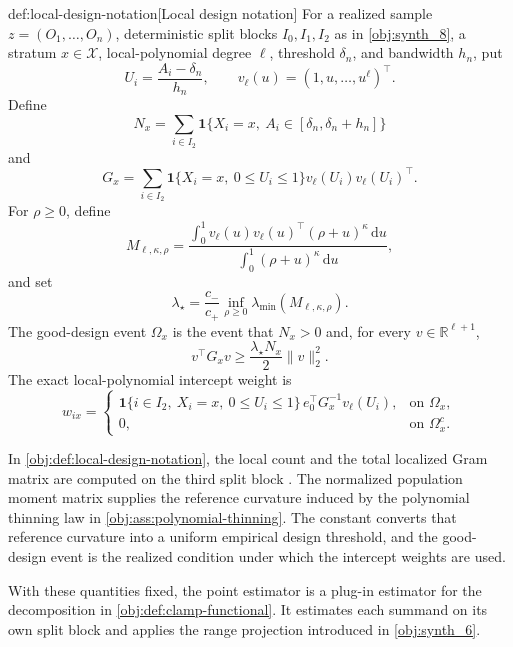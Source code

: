 \documentclass[11pt]{article}
\begin{document}
\begin{definitionv}{def:local-design-notation}[Local design notation]
For a realized sample \(z=(O_1,\ldots,O_n)\), deterministic split blocks \(I_0,I_1,I_2\) as in \cref{obj:synth_8}, a stratum \(x\in\mathcal X\), local-polynomial degree \(\ell\), threshold \(\delta_n\), and bandwidth \(h_n\), put
\[
U_i=\frac{A_i-\delta_n}{h_n},
\qquad
v_\ell(u)=(1,u,\ldots,u^\ell)^\top .
\]
Define
\[
N_x
=
\sum_{i\in I_2}\mathbf 1\{X_i=x,\ A_i\in[\delta_n,\delta_n+h_n]\}
\]
and
\[
G_x
=
\sum_{i\in I_2}
\mathbf 1\{X_i=x,\ 0\leq U_i\leq1\}
v_\ell(U_i)v_\ell(U_i)^\top .
\]
For \(\rho\geq0\), define
\[
M_{\ell,\kappa,\rho}
=
\frac{\int_0^1v_\ell(u)v_\ell(u)^\top(\rho+u)^\kappa\,\mathrm du}
{\int_0^1(\rho+u)^\kappa\,\mathrm du},
\]
and set
\[
\lambda_\star
=
\frac{c_-}{c_+}
\inf_{\rho\geq0}
\lambda_{\min}\!\left(M_{\ell,\kappa,\rho}\right).
\]
The good-design event \(\Omega_x\) is the event that \(N_x>0\) and, for every \(v\in\mathbb R^{\ell+1}\),
\[
v^\top G_xv
\geq
\frac{\lambda_\star N_x}{2}\lVert v\rVert_2^2 .
\]
The exact local-polynomial intercept weight is
\[
w_{ix}
=
\begin{cases}
\mathbf 1\{i\in I_2,\ X_i=x,\ 0\leq U_i\leq1\}\,
e_0^\top G_x^{-1}v_\ell(U_i),
& \text{on }\Omega_x,\\
0, & \text{on }\Omega_x^c .
\end{cases}
\]
\end{definitionv}

In \cref{obj:def:local-design-notation}, the local count  and the total localized Gram matrix  are computed on the third split block . The normalized population moment matrix  supplies the reference curvature induced by the polynomial thinning law in \cref{obj:ass:polynomial-thinning}. The constant  converts that reference curvature into a uniform empirical design threshold, and the good-design event  is the realized condition under which the intercept weights  are used.

With these quantities fixed, the point estimator is a plug-in estimator for the decomposition in \cref{obj:def:clamp-functional}. It estimates each summand on its own split block and applies the range projection introduced in \cref{obj:synth_6}.
\end{document}
